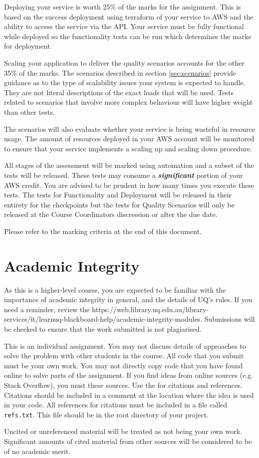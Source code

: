\documentclass{csse4400}
\begin{document}
Deploying your service is worth 25\% of the marks for the assignment. This is based on the success deployment using terraform of your service to AWS and the ability to access the service via the API. Your service must be fully functional while deployed so the functionality tests can be run which determines the marks for deployment.

Scaling your application to deliver the quality scenarios accounts for the other 35\% of the marks. The scenarios described in section \ref{sec:scenarios} provide guidance as to the type of scalability issues your system is expected to handle. They are not literal descriptions of the exact loads that will be used. Tests related to scenarios that involve more complex behaviour will have higher weight than other tests.

The scenarios will also evaluate whether your service is being wasteful in resource usage. The amount of resources deployed in your AWS account will be monitored to ensure that your service implements a scaling up and scaling down procedure.

All stages of the assessment will be marked using automation and a subset of the tests will be released. These tests may consume a \textbf{\emph{significant}} portion of your AWS credit. You are advised to be prudent in how many times you execute these tests. The tests for Functionality and Deployment will be released in their entirety for the checkpoints but the tests for Quality Scenarios will only be released at the Course Coordinators discression or after the due date.

Please refer to the marking criteria at the end of this document.

\section{Academic Integrity}
As this is a higher-level course, you are expected to be familiar with the importance of academic integrity in general, and the details of UQ's rules. If you need a reminder, review the  {https://web.library.uq.edu.au/library-services/it/learnuq-blackboard-help/academic-integrity-modules}. Submissions will be checked to ensure that the work submitted is not plagiarised.

This is an individual assignment. You may not discuss details of approaches to solve the problem with other students in the course. All code that you submit must be your own work. You may not directly copy code that you have found online to solve parts of the assignment. If you find ideas from online sources (e.g. Stack Overflow), you must  these sources. Use the  for citations and references. Citations should be included in a comment at the location where the idea is used in your code. All references for citations must be included in a file called \texttt{refs.txt}. This file should be in the root directory of your project.

Uncited or unreferenced material will be treated as not being your own work. Significant amounts of cited material from other sources will be considered to be of no academic merit.






\end{document}
